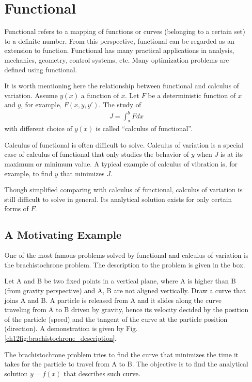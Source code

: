 \chapter{Functional}

Functional refers to a mapping of functions or curves (belonging to a certain set) to a definite number. From this perspective, functional can be regarded as an extension to function. Functional has many practical applications in analysis, mechanics, geometry, control systems, etc. Many optimization problems are defined using functional.

It is worth mentioning here the relationship between functional and calculus of variation. Assume $y(x)$ a function of $x$. Let $F$ be a deterministic function of $x$ and $y$, for example, $F(x, y, y\prime)$. The study of
\begin{eqnarray}
	J = \int_{a}^{b} F dx \nonumber
\end{eqnarray}
with different choice of $y(x)$ is called ``calculus of functional''.

Calculus of functional is often difficult to solve. Calculus of variation is a special case of calculus of functional that only studies the behavior of $y$ when $J$ is at its maximum or minimum value. A typical example of calculus of vibration is, for example, to find $y$ that minimizes $J$.

Though simplified comparing with calculus of functional, calculus of variation is still difficult to solve in general. Its analytical solution exists for only certain forms of $F$.

\section{A Motivating Example}

One of the most famous problems solved by functional and calculus of variation is the brachistochrone problem. The description to the problem is given in the box.

\begin{shortbox}

Let A and B be two fixed points in a vertical plane, where A is higher than B (from gravity perspective) and A, B are not aligned vertically. Draw a curve that joins A and B. A particle is released from A and it slides along the curve traveling from A to B driven by gravity, hence its velocity decided by the position of the particle (speed) and the tangent of the curve at the particle position (direction). A demonstration is given by Fig. \ref{ch12fig:brachistochrone_description}.

The brachistochrone problem tries to find the curve that minimizes the time it takes for the particle to travel from A to B. The objective is to find the analytical solution $y=f(x)$ that describes such curve.

\end{shortbox}

